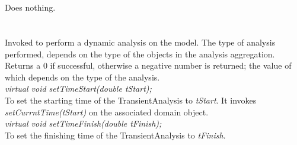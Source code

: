  \\
\\ 
Does nothing. \\

\\
 \\
Invoked to perform a dynamic analysis on the model. The type of analysis
performed, depends on the type of the objects in the analysis
aggregation. Returns a $0$ if successful, otherwise a negative number
is returned; the value of which depends on the type of the analysis. \\

{\em virtual void setTimeStart(double tStart);}\\
To set the starting time of the TransientAnalysis to {\em tStart}. It
invokes {\em setCurrntTime(tStart)} on the associated domain object.\\

{\em virtual void setTimeFinish(double tFinish);}\\
To set the finishing time of the TransientAnalysis to {\em tFinish}. \\

\\
